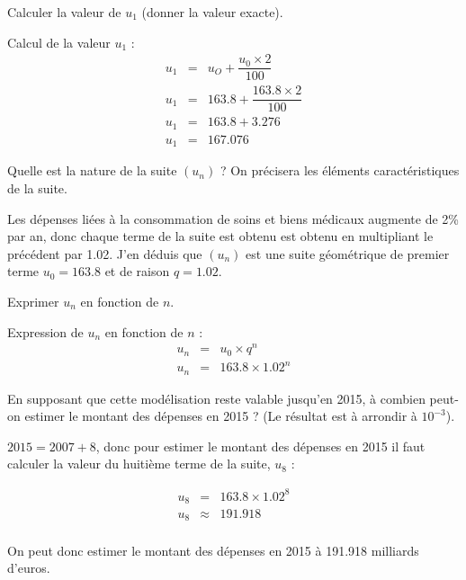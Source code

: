 \begin{questions}
	\question[1] Calculer la valeur de $u_1$ (donner la valeur exacte).
	\begin{solution}
		Calcul de la valeur $u_1$ :
		\begin{eqnarray*}
			u_1 &=& u_O + \dfrac{u_0 \times 2}{100} \\
			u_1 &=& \num{163.8} + \dfrac{\num{163.8} \times 2}{100} \\
			u_1 &=& \num{163.8} + \num{3.276} \\
			u_1 &=& \num{167.076}
		\end{eqnarray*}
	\end{solution} 
	
	\question[1] Quelle est la nature de la suite $(u_n)$ ? On précisera les éléments caractéristiques de la suite.
	\begin{solution}
		Les dépenses liées à la consommation de soins et biens médicaux augmente de 2\% par an, donc chaque terme de la suite est obtenu est obtenu en multipliant le précédent par \num{1.02}.
		J'en déduis que $(u_n)$ est une suite géométrique de premier terme $u_0=\num{163.8}$ et de raison $q=\num{1.02}$.
	\end{solution}
	
	\question[1] Exprimer $u_n$ en fonction de $n$.
	\begin{solution}
		Expression de $u_n$ en fonction de $n$ :
		\begin{eqnarray*}
			u_n &=& u_0 \times q^n \\
			u_n &=& \num{163.8} \times \num{1.02}^n 
		\end{eqnarray*}
	\end{solution}
	
	\question[1] En supposant que cette modélisation reste valable jusqu'en 2015, à combien peut-on estimer le montant des dépenses en 2015 ? (Le résultat est à arrondir à $10^{-3}$).
	
	\begin{solution}
				
		$2015 = 2007 + 8$, donc pour estimer le montant des dépenses en 2015 il faut calculer la valeur du huitième terme de la suite, $u_8$ :
		
		\begin{eqnarray*}
			u_8 &=& \num{163.8} \times \num{1.02}^8 \\
			u_8 &\approx&  \num{191.918}\\
		\end{eqnarray*}
		
		On peut donc estimer le montant des dépenses en 2015 à  \num{191.918} milliards d'euros.
	\end{solution}
\end{questions}

  